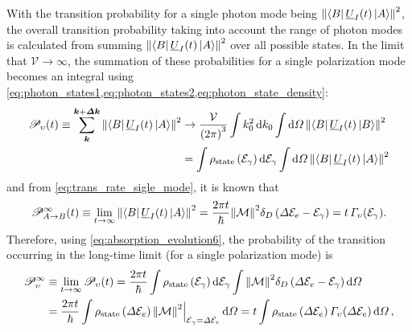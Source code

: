 With the transition probability for a single photon mode being $\norm{\bra{B} \underline{U}_I (t) \ket{A}}^2$, the overall transition probability taking into account the range of photon modes is calculated from summing $\norm{\bra{B} \underline{U}_I (t) \ket{A}}^2$ over all possible states. 
In the limit that $\mathcal{V} \to \infty$, the summation of these probabilities for a single polarization mode becomes an integral using \cref{eq:photon_states1,eq:photon_states2,eq:photon_state_density}:
\begin{align}\label{eq:absorption_evolution6}
 \begin{split}
 \mathscr{P}_{\upsilon} (t) \equiv \sum_{\mathbold{k}}^{\mathbold{k} + \mathbold{\Delta k}} \norm{\bra{B} \underline{U}_I (t) \ket{A}}^2 &\to \frac{\mathcal{V}}{\left( 2 \pi \right)^3} \int k_0^2 \dd{k_0} \int \dd{\Omega} \norm{\bra{B} \underline{U}_I (t) \ket{B}}^2 \\
 &= \int \rho_{\text{state}} \left( \mathcal{E}_{\gamma} \right) \dd{\mathcal{E}_{\gamma}} \int \dd{\Omega} \norm{\bra{B} \underline{U}_I (t) \ket{A}}^2 
 \end{split}
 \end{align}
and from \cref{eq:trans_rate_sigle_mode}, it is known that 
\begin{equation*}
 \mathscr{P}_{A \to B}^{\infty} (t) \equiv \lim_{t \to \infty} \norm{\bra{B} \underline{U}_I (t) \ket{A}}^2 = \frac{2 \pi t}{\hbar} \norm{\mathcal{M}}^2 \delta_D \left( \Delta \mathcal{E}_e - \mathcal{E}_{\gamma} \right) = t \, \Gamma_{\upsilon} (\mathcal{E}_{\gamma}) .
 \end{equation*}
Therefore, using \cref{eq:absorption_evolution6}, the probability of the transition occurring in the long-time limit (for a single polarization mode) is 
\begin{align}
 \begin{split}\label{eq:long_time_trans_prob}
 \mathscr{P}_{\upsilon}^{\infty} &\equiv \lim_{t \to \infty} \mathscr{P}_{\upsilon} (t) = \frac{2 \pi t}{\hbar} \int \rho_{\text{state}} \left( \mathcal{E}_{\gamma} \right) \dd{\mathcal{E}_{\gamma}} \int \norm{\mathcal{M}}^2 \delta_D \left( \Delta \mathcal{E}_e - \mathcal{E}_{\gamma} \right) \dd{\Omega} \\
 &= \frac{2 \pi t}{\hbar} \int \rho_{\text{state}} \left( \Delta \mathcal{E}_e \right) \norm{\mathcal{M}}^2 \Big|_{\mathcal{E}_{\gamma} = \Delta \mathcal{E}_e} \dd{\Omega} = t \int \rho_{\text{state}} \left( \Delta \mathcal{E}_e \right) \Gamma_{\upsilon} (\Delta \mathcal{E}_e) \dd{\Omega} ,
 \end{split}
 \end{align}
